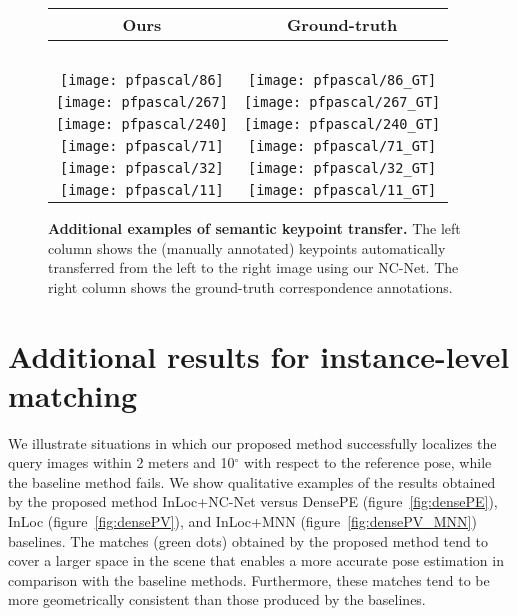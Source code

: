 \documentclass{article}
\begin{document}
\begin{figure}[tbp]
  \centering
  \begingroup
  \renewcommand{\arraystretch}{0.5}
  \begin{tabular}{@{\hskip 1pt}c@{\hskip 6pt}|@{\hskip 6pt}c@{\hskip 1pt}}
    Ours & Ground-truth \\ \hline
    ~ & ~ \\
\texttt{[image: pfpascal/86]}  & 
\texttt{[image: pfpascal/86\_GT]} \\
\texttt{[image: pfpascal/267]}  & 
\texttt{[image: pfpascal/267\_GT]} \\
\texttt{[image: pfpascal/240]}  & 
\texttt{[image: pfpascal/240\_GT]} \\
\texttt{[image: pfpascal/71]}  & 
\texttt{[image: pfpascal/71\_GT]} \\
\texttt{[image: pfpascal/32]}  & 
\texttt{[image: pfpascal/32\_GT]} \\
\texttt{[image: pfpascal/11]}  & 
\texttt{[image: pfpascal/11\_GT]} \\
  \end{tabular}
  \endgroup
  \vspace{2pt}
  \caption{{\bf Additional examples of semantic  keypoint  transfer.} The left column shows the (manually annotated) keypoints automatically transferred from the left to the right image using our NC-Net. The right column shows the ground-truth correspondence annotations.}
  \label{fig:qualPascal2}
\end{figure}



\section{Additional results for instance-level matching\label{apx:inst_level}}
We illustrate situations in which our proposed method successfully localizes the query images within 2 meters and 10$^\circ$ with respect to the reference pose, while the baseline method fails. We show qualitative examples of the results obtained by the proposed method InLoc+NC-Net versus 
DensePE (figure~\ref{fig:densePE}), InLoc (figure~\ref{fig:densePV}), 
and InLoc+MNN (figure~\ref{fig:densePV_MNN}) baselines.
The matches (green dots) obtained by the proposed method tend to cover a larger space in the scene that enables a more accurate pose estimation in comparison with the baseline methods. Furthermore, these matches tend to be more geometrically consistent than those produced by the baselines.
\end{document}
